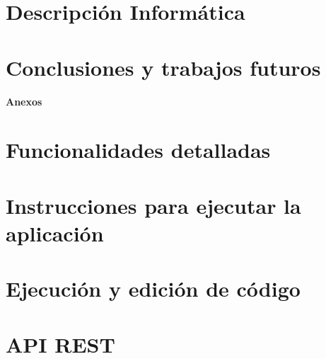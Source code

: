 \documentclass[12pt,twoside,titlepage]{report}
\begin{document}
\blankpage

\chapter{Descripción Informática}
\label{sec:descripcionInformatica}
\setcounter{page}{25}
\minitoc
\break



\blankpage


\chapter{Conclusiones y trabajos futuros}
\setcounter{page}{61}


\blankpage



{}
\setcounter{page}{64}
\footnotesize{
%


}

\normalsize

\afterpage{\blankpage}

\newpage





\appendix

{}

\mbox{}
\vfill
\begin{center}
\begin{Huge}
\textbf{Anexos}
\end{Huge}
\end{center}
\vfill
\mbox{}
\thispagestyle{empty}

\newpage
\mbox{}
\thispagestyle{empty}
\newpage


\chapter{Funcionalidades detalladas}
\label{anexo:funcionalidades-detalladas}
\setcounter{page}{65}


\chapter{Instrucciones para ejecutar la aplicación}
\label{anexo:instrucciones-ejecutar-aplicacion}


\chapter{Ejecución y edición de código}
\label{anexo:ejecucion-edicion-codigo}


\chapter{API REST}
\label{anexo:api_rest}

\end{document}
